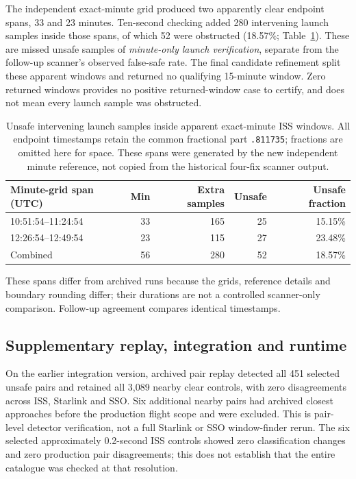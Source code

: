 \documentclass[11pt,a4paper]{article}
\begin{document}
The independent exact-minute grid produced two apparently clear endpoint
spans, 33 and 23 minutes. Ten-second checking added 280 intervening launch
samples inside those spans, of which 52 were obstructed
(18.57\%; Table~\ref{tab:minute-gaps}). These are missed unsafe samples of
\emph{minute-only launch verification}, separate from the follow-up
scanner's observed false-safe rate. The final candidate refinement split
these apparent windows and returned no qualifying 15-minute window.
Zero returned windows provides no positive returned-window case to certify,
and does not mean every launch sample was obstructed.

\begin{table}[htbp]
\centering
\small
\begin{tabular}{lrrrr}
\toprule
Minute-grid span (UTC) & Min & Extra samples & Unsafe & Unsafe fraction \\
\midrule
10:51:54--11:24:54 & 33 & 165 & 25 & 15.15\% \\
12:26:54--12:49:54 & 23 & 115 & 27 & 23.48\% \\
\midrule
Combined & 56 & 280 & 52 & 18.57\% \\
\bottomrule
\end{tabular}
\caption{Unsafe intervening launch samples inside apparent exact-minute
ISS windows. All endpoint timestamps retain the common fractional part
\texttt{.811735}; fractions are omitted here for space. These spans were
generated by the new independent minute reference, not copied from the
historical four-fix scanner output.}
\label{tab:minute-gaps}
\end{table}

These spans differ from archived runs because the grids, reference details
and boundary rounding differ; their durations are not a controlled
scanner-only comparison. Follow-up agreement compares identical timestamps.

\subsection{Supplementary replay, integration and runtime}

On the earlier integration version, archived pair replay detected all 451
selected unsafe pairs and retained all 3,089 nearby clear controls, with
zero disagreements across ISS, Starlink and SSO. Six additional nearby
pairs had archived closest approaches before the production flight scope
and were excluded. This is pair-level detector verification, not a full
Starlink or SSO window-finder rerun. The six selected approximately
0.2-second ISS controls showed zero classification changes and zero
production pair disagreements; this does not establish that the entire
catalogue was checked at that resolution.
\end{document}
